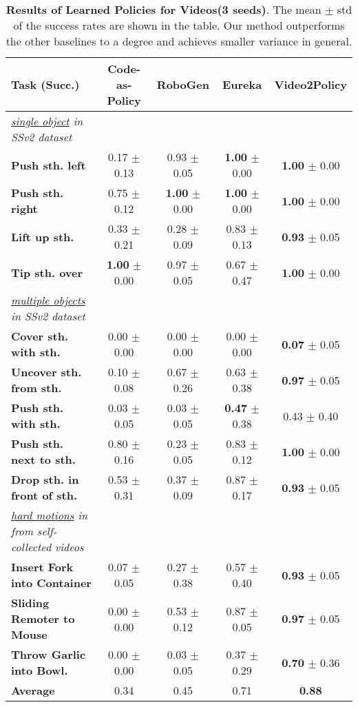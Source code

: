 \begin{table*}[t]
    \centering
    \vskip -0.3cm
    \caption{\label{tab:main_results_sth} \textbf{Results of Learned Policies for Videos(3 seeds)}. The mean $\pm$ std of the success rates are shown in the table. Our method outperforms the other baselines to a degree and achieves smaller variance in general.} 
    \begin{tabular}{l|cccc}
        \toprule
        \textbf{Task} (Succ.) & \textbf{Code-as-Policy} & \textbf{RoboGen} & \textbf{Eureka} & \textbf{Video2Policy} \\
        \midrule
        \textit{\underline{single object} in SSv2 dataset } & \\
        \textbf{Push sth. left} & 0.17 $\pm$ 0.13 & 0.93 $\pm$ 0.05 & \textbf{1.00} $\pm$ 0.00 & \textbf{1.00} $\pm$ 0.00 \\
        \textbf{Push sth. right} & 0.75 $\pm$ 0.12 & \textbf{1.00} $\pm$ 0.00 & \textbf{1.00} $\pm$ 0.00 & \textbf{1.00} $\pm$ 0.00 \\
        \textbf{Lift up sth.} & 0.33 $\pm$ 0.21 & 0.28 $\pm$ 0.09 & 0.83 $\pm$ 0.13 & \textbf{0.93} $\pm$ 0.05 \\
        \textbf{Tip sth. over} & \textbf{1.00} $\pm$ 0.00 & 0.97 $\pm$ 0.05 & 0.67 $\pm$ 0.47 & \textbf{1.00} $\pm$ 0.00 \\
        \midrule
        \textit{\underline{multiple objects} in SSv2 dataset} \\
        \textbf{Cover sth. with sth.} & 0.00 $\pm$ 0.00  & 0.00 $\pm$ 0.00  & 0.00 $\pm$ 0.00  & \textbf{0.07} $\pm$ 0.05 \\
        \textbf{Uncover sth. from sth.} & 0.10 $\pm$ 0.08 & 0.67 $\pm$ 0.26 & 0.63 $\pm$ 0.38 & \textbf{0.97} $\pm$ 0.05 \\
        \textbf{Push sth. with sth.} & 0.03 $\pm$ 0.05 & 0.03 $\pm$ 0.05 & \textbf{0.47} $\pm$ 0.38 & 0.43 $\pm$ 0.40 \\
        \textbf{Push sth. next to sth.} & 0.80 $\pm$ 0.16 & 0.23 $\pm$ 0.05 & 0.83 $\pm$ 0.12 & \textbf{1.00} $\pm$ 0.00 \\
        \textbf{Drop sth. in front of sth.} & 0.53 $\pm$ 0.31 & 0.37 $\pm$ 0.09 & 0.87 $\pm$ 0.17 & \textbf{0.93} $\pm$ 0.05 \\
        \midrule 
        \textit{\underline{hard motions} in from self-collected videos} \\
        \textbf{Insert Fork into Container} & 0.07 $\pm$ 0.05 & 0.27 $\pm$ 0.38 & 0.57 $\pm$ 0.40 & \textbf{0.93} $\pm$ 0.05 \\
        \textbf{Sliding Remoter to Mouse} & 0.00 $\pm$ 0.00 & 0.53 $\pm$ 0.12 & 0.87 $\pm$ 0.05 & \textbf{0.97} $\pm$ 0.05 \\
        \textbf{Throw Garlic into Bowl.} & 0.00 $\pm$ 0.00 & 0.03 $\pm$ 0.05 & 0.37 $\pm$ 0.29 & \textbf{0.70} $\pm$ 0.36 \\
        \midrule
        \textbf{Average} & 0.34 & 0.45 & 0.71 & \textbf{0.88} \\
        \bottomrule
    \end{tabular}
    \vskip -0.3cm
\end{table*}


